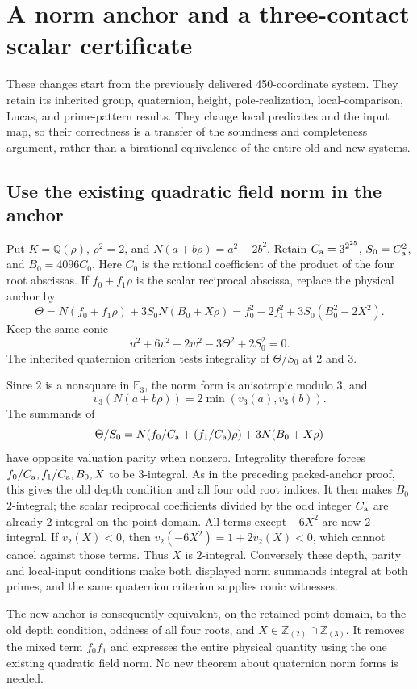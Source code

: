 \section{A norm anchor and a three-contact scalar certificate}

These changes start from the previously delivered 450-coordinate system.
They retain its inherited group, quaternion, height, pole-realization,
local-comparison, Lucas, and prime-pattern results. They change local
predicates and the input map, so their correctness is a transfer of the
soundness and completeness argument, rather than a birational equivalence
of the entire old and new systems.

\subsection{Use the existing quadratic field norm in the anchor}

Put $K=\mathbb Q(\rho)$, $\rho^2=2$, and
$N(a+b\rho)=a^2-2b^2$. Retain
$C_{\rm a}=3^{2^{25}}$, $S_0=C_{\rm a}^2$, and $B_0=4096C_0$.
Here $C_0$ is the rational coefficient of the product of the four root
abscissas. If $f_0+f_1\rho$ is the scalar reciprocal abscissa, replace
the physical anchor by
\[
 \Theta=N(f_0+f_1\rho)+3S_0N(B_0+X\rho)
 =f_0^2-2f_1^2+3S_0(B_0^2-2X^2).
\]
Keep the same conic
\[
 u^2+6v^2-2w^2-3\Theta^2+2S_0^2=0.
\]
The inherited quaternion criterion tests integrality of $\Theta/S_0$
at $2$ and $3$.

Since $2$ is a nonsquare in $\mathbb F_3$, the norm form is anisotropic
modulo $3$, and
\[
 v_3(N(a+b\rho))=2\min(v_3(a),v_3(b)).
\]
The summands of
\[
 \Theta/S_0
 =N(f_0/C_{\rm a}+(f_1/C_{\rm a})\rho)
       +3N(B_0+X\rho)
\]
have opposite valuation parity when nonzero. Integrality therefore
forces $f_0/C_{\rm a},f_1/C_{\rm a},B_0,X$ to be $3$-integral.
As in the preceding packed-anchor proof, this gives the old depth
condition and all four odd root indices. It then makes $B_0$ $2$-integral;
the scalar reciprocal coefficients divided by the odd integer $C_{\rm a}$
are already $2$-integral on the point domain.
All terms except $-6X^2$ are now $2$-integral. If $v_2(X)<0$, then
$v_2(-6X^2)=1+2v_2(X)<0$, which cannot cancel against those terms.
Thus $X$ is $2$-integral. Conversely these depth, parity and local-input
conditions make both displayed norm summands integral at both primes,
and the same quaternion criterion supplies conic witnesses.

The new anchor is consequently equivalent, on the retained point domain,
to the old depth condition, oddness of all four roots, and
$X\in\mathbb Z_{(2)}\cap\mathbb Z_{(3)}$. It removes the mixed term
$f_0f_1$ and expresses the entire physical quantity using the one existing
quadratic field norm. No new theorem about quaternion norm forms is needed.

